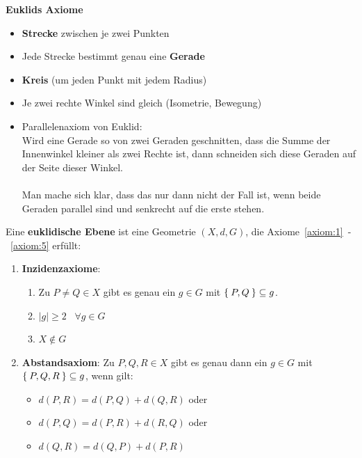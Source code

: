 \textbf{Euklids Axiome}
\begin{itemize}
    \item \textbf{Strecke} zwischen je zwei Punkten
    \item Jede Strecke bestimmt genau eine \textbf{Gerade}
    \item \textbf{Kreis} (um jeden Punkt mit jedem Radius)
    \item Je zwei rechte Winkel sind gleich (Isometrie, Bewegung)
    \item Parallelenaxiom von Euklid:\\
        Wird eine Gerade so von zwei Geraden geschnitten, dass die 
        Summe der Innenwinkel kleiner als zwei Rechte ist, dann schneiden sich
        diese Geraden auf der Seite dieser Winkel.\\
        \\
        Man mache sich klar, dass das nur dann nicht der Fall ist, 
        wenn beide Geraden parallel sind und senkrecht auf die erste stehen.
\end{itemize}

\begin{definition}%
    Eine \textbf{euklidische Ebene} ist eine Geometrie $(X,d, G)$, die
    Axiome~\ref{axiom:1}~-~\ref{axiom:5} erfüllt:
    \begin{enumerate}[label=§\arabic*),ref=§\arabic*]
        \item \textbf{Inzidenzaxiome}:\label{axiom:1}
            \begin{enumerate}[label=(\roman*),ref=\theenumi{} (\roman*)]
                \item \label{axiom:1.1} Zu $P \neq Q \in X$ gibt es genau ein $g \in G$ mit
                      $\Set{P, Q} \subseteq g$.
                \item \label{axiom:1.2} $|g| \geq 2 \;\;\; \forall g \in G$
                \item \label{axiom:1.3} $X \notin G$
            \end{enumerate}
        \item \textbf{Abstandsaxiom}: Zu $P, Q, R \in X$ gibt es \label{axiom:2}
              genau dann ein $g \in G$ mit $\Set{P, Q, R} \subseteq g$,
              wenn gilt: 
              \begin{itemize}[]
                \item $d(P, R) = d(P, Q) + d(Q, R)$ oder
                \item $d(P, Q) = d(P, R) + d(R, Q)$ oder
                \item $d(Q, R) = d(Q, P) + d(P, R)$
              \end{itemize}
    \end{enumerate}
\end{definition}

